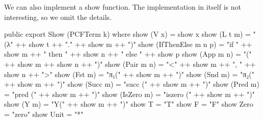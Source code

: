 We can also implement a show function. The implementation in itself is not
interesting, so we omit the details.

\begin{hidden}
public export
Show (PCFTerm k) where
  show (V x)              = show x
  show (L t m)            = "(λ" ++ show t ++ "." ++ show m ++ ")"
  show (IfThenElse m n p) = "if " ++ show m ++ " then " ++ show n ++ " else " ++ show p
  show (App m n)          = "(" ++ show m ++ show n ++ ")"
  show (Pair m n)         = "<" ++ show m ++ ", " ++ show n ++ ">"
  show (Fst m)            = "π₁(" ++ show m ++ ")"
  show (Snd m)            = "π₂(" ++ show m ++ ")"
  show (Succ m)           = "succ (" ++ show m ++ ")"
  show (Pred m)           = "pred (" ++ show m ++ ")"
  show (IsZero m)         = "iszero (" ++ show m ++ ")"
  show (Y m)              = "Y(" ++ show m ++ ")"
  show T                  = "T"
  show F                  = "F"
  show Zero               = "zero"
  show Unit               = "*"
\end{hidden}
